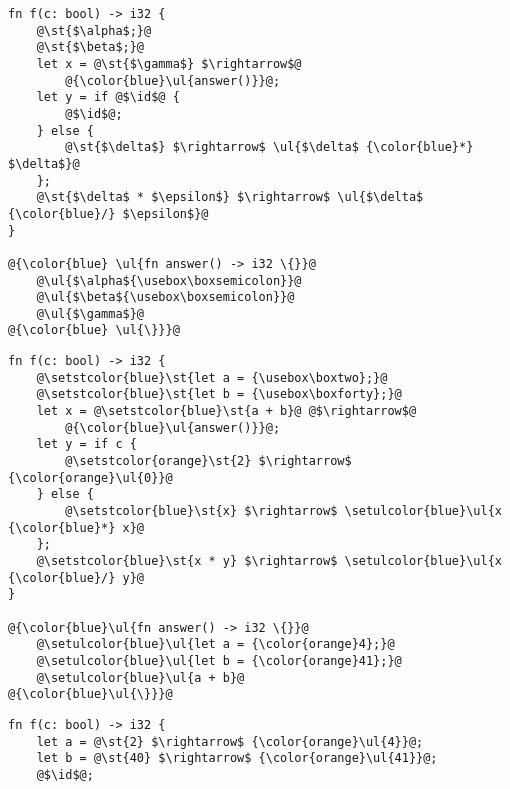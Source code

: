 \documentclass[a4paper,11pt]{article}
\newcommand\id{\square}
\begin{document}
\noindent
\begin{minipage}{\textwidth}
\begin{minipage}{.32\textwidth}
\newbox\boxsemicolon
\sbox\boxsemicolon{\color{blue}\texttt{;}}
\begin{lstlisting}[rulecolor=\color{blue!20}]
fn f(c: bool) -> i32 {
    @\st{$\alpha$;}@
    @\st{$\beta$;}@
    let x = @\st{$\gamma$} $\rightarrow$@
        @{\color{blue}\ul{answer()}}@;
    let y = if @$\id$@ {
        @$\id$@;
    } else {
        @\st{$\delta$} $\rightarrow$ \ul{$\delta$ {\color{blue}*} $\delta$}@
    };
    @\st{$\delta$ * $\epsilon$} $\rightarrow$ \ul{$\delta$ {\color{blue}/} $\epsilon$}@
}

@{\color{blue} \ul{fn answer() -> i32 \{}}@
    @\ul{$\alpha${\usebox\boxsemicolon}}@
    @\ul{$\beta${\usebox\boxsemicolon}}@
    @\ul{$\gamma$}@
@{\color{blue} \ul{\}}}@
\end{lstlisting}
\end{minipage}\hfill
\begin{minipage}{.32\textwidth}
\newbox\boxtwo
\sbox{}
\newbox\boxforty
\sbox{}
\begin{lstlisting}
fn f(c: bool) -> i32 {
    @\setstcolor{blue}\st{let a = {\usebox\boxtwo};}@
    @\setstcolor{blue}\st{let b = {\usebox\boxforty};}@
    let x = @\setstcolor{blue}\st{a + b}@ @$\rightarrow$@
        @{\color{blue}\ul{answer()}}@;
    let y = if c {
        @\setstcolor{orange}\st{2} $\rightarrow$ {\color{orange}\ul{0}}@
    } else {
        @\setstcolor{blue}\st{x} $\rightarrow$ \setulcolor{blue}\ul{x {\color{blue}*} x}@
    };
    @\setstcolor{blue}\st{x * y} $\rightarrow$ \setulcolor{blue}\ul{x {\color{blue}/} y}@
}

@{\color{blue}\ul{fn answer() -> i32 \{}}@
    @\setulcolor{blue}\ul{let a = {\color{orange}4};}@
    @\setulcolor{blue}\ul{let b = {\color{orange}41};}@
    @\setulcolor{blue}\ul{a + b}@
@{\color{blue}\ul{\}}}@
\end{lstlisting}
\end{minipage}\hfill
\begin{minipage}{.32\textwidth}
\begin{lstlisting}[rulecolor=\color{orange!30}]
fn f(c: bool) -> i32 {
    let a = @\st{2} $\rightarrow$ {\color{orange}\ul{4}}@;
    let b = @\st{40} $\rightarrow$ {\color{orange}\ul{41}}@;
    @$\id$@;


\end{lstlisting}
\end{minipage}
\end{minipage}
\end{document}
